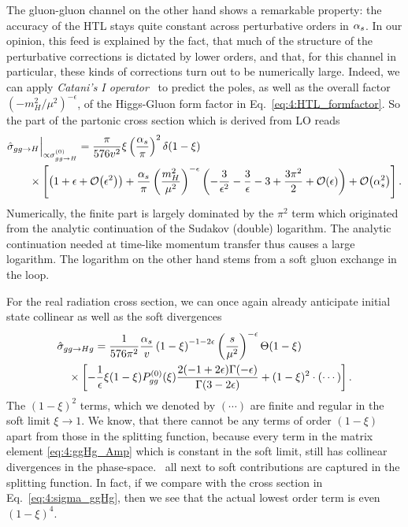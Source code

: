 The gluon-gluon channel on the other hand shows a remarkable property: the accuracy of the \acs{HTL} stays quite constant across perturbative orders in $\alpha_s$. In our opinion, this feed is explained by the fact, that much of the structure of the perturbative corrections is dictated by lower orders, and that, for this channel in particular, these kinds of corrections turn out to be numerically large. Indeed, we can apply \textit{Catani's I operator}~\cite{Catani:1996vz} to predict the poles, as well as the overall factor $(-m_H^2/\mu^2)^{-\epsilon}$, of the Higgs-Gluon form factor in Eq.~\eqref{eq:4:HTL_formfactor}. So the part of the partonic cross section which is derived from \acs{LO} reads
\begin{equation}
\begin{split}
&\hat{\sigma}_{gg \rightarrow H} \Big \vert_{\propto \sigma_{gg \rightarrow H}^{(0)}} = \frac{\pi}{576 v^2} \xi  \left(\frac{\alpha_s}{\pi} \right)^2 \delta(1 - \xi) \\
&\qquad \times \left[ \left( 1 + \epsilon + \mathcal{O}\!\left(\epsilon^2\right) \right) + \frac{\alpha_s}{\pi} \left(\frac{m_H^2}{\mu^2} \right)^{-\epsilon} \left(-\frac{3}{\epsilon^2} - \frac{3}{\epsilon} - 3 + \frac{3 \pi^2}{2} + \mathcal{O}\!\left(\epsilon\right) \right) + \mathcal{O}\!\left(\alpha_s^2\right) \right].
\end{split}
\label{eq:4:ggH_xSec_propto_LO}
\end{equation}
Numerically, the finite part is largely dominated by the $\pi^2$ term which originated from the analytic continuation of the Sudakov (double) logarithm. The analytic continuation needed at time-like momentum transfer thus causes a large logarithm. The logarithm on the other hand stems from a soft gluon exchange in the loop.

For the real radiation cross section, we can once again already anticipate initial state collinear as well as the soft divergences
\begin{equation}
  \begin{split}
  & \hat{\sigma}_{gg \rightarrow H g} = \frac{1}{576 \pi^2} \frac{\alpha_s}{v} \left(1 - \xi \right)^{-1 - 2 \epsilon} \left( \frac{s}{\mu^2} \right)^{-\epsilon} \Theta (1 - \xi) \\
  & \quad \times \left[ - \frac{1}{\epsilon} \xi (1 - \xi) P_{gg}^{(0)}(\xi) \frac{2 (-1 + 2 \epsilon) \Gamma (-\epsilon)}{\Gamma (3 - 2 \epsilon)} +  (1 - \xi)^2 \cdot (\cdots)  \right].
  \end{split}
\end{equation}
The $(1 - \xi)^2$ terms, which we denoted by $(\cdots)$ are finite and regular in the soft limit $\xi \rightarrow 1$. We know, that there cannot be any terms of order $(1 - \xi)$ apart from those in the splitting function, because every term in the matrix element \eqref{eq:4:ggHg_Amp} which is constant in the soft limit, still has collinear divergences in the phase-space. \Ie\ all next to soft contributions are captured in the splitting function. In fact, if we compare with the cross section in Eq.~\eqref{eq:4:sigma_ggHg}, then we see that the actual lowest order term is even $(1 - \xi)^4$.

